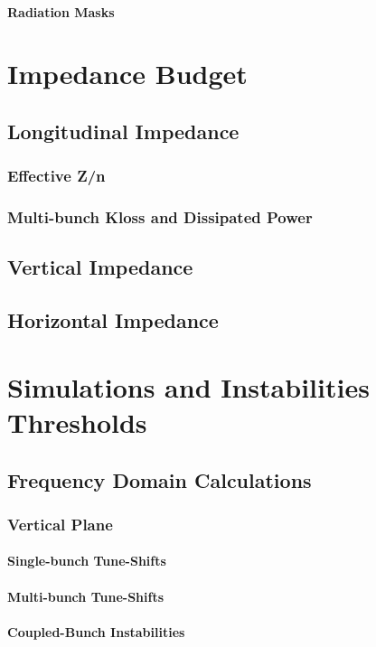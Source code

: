 \paragraph{Radiation Masks}
\subsection{}
\section{Impedance Budget}
\subsection{Longitudinal Impedance}
\subsubsection{Effective Z/n}
\subsubsection{Multi-bunch Kloss and Dissipated Power}
\subsection{Vertical Impedance}
\subsection{Horizontal Impedance}
\section{Simulations and Instabilities Thresholds}
\subsection{Frequency Domain Calculations}
\subsubsection{Vertical Plane}
\paragraph{Single-bunch Tune-Shifts}
\paragraph{Multi-bunch Tune-Shifts}
\paragraph{Coupled-Bunch Instabilities}
